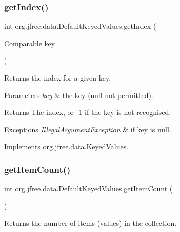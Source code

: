 \subsubsection{\texorpdfstring{get\+Index()}{getIndex()}}
{\footnotesize\ttfamily int org.\+jfree.\+data.\+Default\+Keyed\+Values.\+get\+Index (\begin{DoxyParamCaption}\item[{Comparable}]{key }\end{DoxyParamCaption})}

Returns the index for a given key.


\begin{DoxyParams}{Parameters}
{\em key} & the key ({\ttfamily null} not permitted).\\
\hline
\end{DoxyParams}
\begin{DoxyReturn}{Returns}
The index, or {\ttfamily -\/1} if the key is not recognised.
\end{DoxyReturn}

\begin{DoxyExceptions}{Exceptions}
{\em Illegal\+Argument\+Exception} & if {\ttfamily key} is {\ttfamily null}. \\
\hline
\end{DoxyExceptions}


Implements \mbox{\hyperlink{interfaceorg_1_1jfree_1_1data_1_1_keyed_values_ae360fa76e98655c84180651f8e1395d7}{org.\+jfree.\+data.\+Keyed\+Values}}.

\mbox{\label{classorg_1_1jfree_1_1data_1_1_default_keyed_values_a82166915731034d230c83ee87177cd3b}} 
\subsubsection{\texorpdfstring{get\+Item\+Count()}{getItemCount()}}
{\footnotesize\ttfamily int org.\+jfree.\+data.\+Default\+Keyed\+Values.\+get\+Item\+Count (\begin{DoxyParamCaption}{ }\end{DoxyParamCaption})}

Returns the number of items (values) in the collection.

